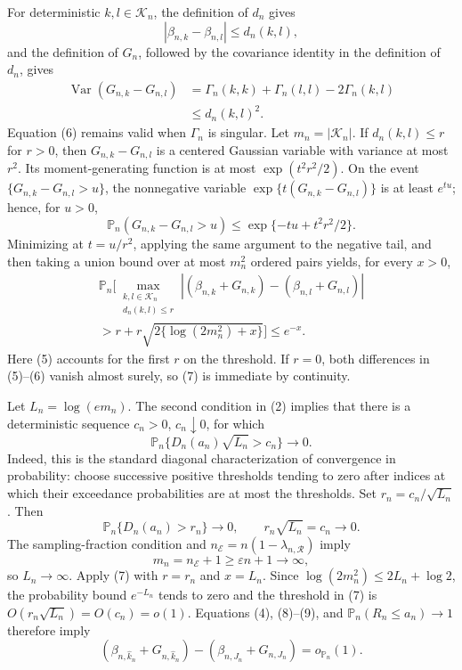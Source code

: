 For deterministic \(k,l\in\mathcal K_n\), the definition of \(d_n\) gives
\[
 |\beta_{n,k}-\beta_{n,l}|\leq d_n(k,l), \tag{5}
\]
and the definition of \(G_n\), followed by the covariance identity in the definition of \(d_n\), gives
\[
 \begin{aligned}
 \operatorname{Var}(G_{n,k}-G_{n,l})
 &=\Gamma_n(k,k)+\Gamma_n(l,l)-2\Gamma_n(k,l)\\
 &\leq d_n(k,l)^2. 
 \end{aligned} \tag{6}
\]
Equation (6) remains valid when \(\Gamma_n\) is singular.  Let \(m_n=|\mathcal K_n|\).  If \(d_n(k,l)\leq r\) for \(r>0\), then \(G_{n,k}-G_{n,l}\) is a centered Gaussian variable with variance at most \(r^2\).  Its moment-generating function is at most \(\exp(t^2r^2/2)\).  On the event \(\{G_{n,k}-G_{n,l}>u\}\), the nonnegative variable \(\exp\{t(G_{n,k}-G_{n,l})\}\) is at least \(e^{tu}\); hence, for \(u>0\),
\[
 \mathbb P_n(G_{n,k}-G_{n,l}>u)
 \leq \exp\{-tu+t^2r^2/2\}.
\]
Minimizing at \(t=u/r^2\), applying the same argument to the negative tail, and then taking a union bound over at most \(m_n^2\) ordered pairs yields, for every \(x>0\),
\[
 \begin{split}
 \mathbb P_n\Bigg[
 \max_{\substack{k,l\in\mathcal K_n\\d_n(k,l)\leq r}}
 |(\beta_{n,k}+G_{n,k})-(\beta_{n,l}+G_{n,l})|\\
 >r+r\sqrt{2\{\log(2m_n^2)+x\}}
 \Bigg]\leq e^{-x}. 
 \end{split} \tag{7}
\]
Here (5) accounts for the first \(r\) on the threshold.  If \(r=0\), both differences in (5)--(6) vanish almost surely, so (7) is immediate by continuity.

Let \(L_n=\log(em_n)\).  The second condition in (2) implies that there is a deterministic sequence \(c_n>0\), \(c_n\downarrow0\), for which
\[
 \mathbb P_n\{D_n(a_n)\sqrt{L_n}>c_n\}\longrightarrow0. \tag{8}
\]
Indeed, this is the standard diagonal characterization of convergence in probability: choose successive positive thresholds tending to zero after indices at which their exceedance probabilities are at most the thresholds.  Set \(r_n=c_n/\sqrt{L_n}\).  Then
\[
 \mathbb P_n\{D_n(a_n)>r_n\}\longrightarrow0,
 \qquad
 r_n\sqrt{L_n}=c_n\longrightarrow0. \tag{9}
\]
The sampling-fraction condition and \(n_{\mathcal E}=n(1-\lambda_{n,\mathcal R})\) imply
\[
 m_n=n_{\mathcal E}+1\geq\varepsilon n+1\longrightarrow\infty,
\]
so \(L_n\to\infty\).  Apply (7) with \(r=r_n\) and \(x=L_n\).  Since \(\log(2m_n^2)\leq2L_n+\log2\), the probability bound \(e^{-L_n}\) tends to zero and the threshold in (7) is \(O(r_n\sqrt{L_n})=O(c_n)=o(1)\).  Equations (4), (8)--(9), and \(\mathbb P_n(R_n\leq a_n)\to1\) therefore imply
\[
 (\beta_{n,\widehat k_n}+G_{n,\widehat k_n})
 -(\beta_{n,J_n}+G_{n,J_n})=o_{\mathbb P_n}(1). \tag{10}
\]

